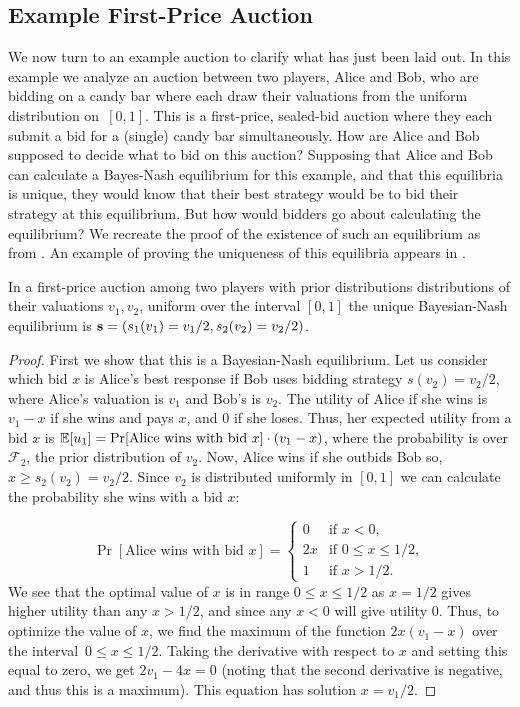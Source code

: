 \documentclass[12pt,twoside]{reedthesis}
\begin{document}
\subsection{Example First-Price Auction}
We now turn to an example auction to clarify what has just been laid out. In this example we analyze an auction between two players, Alice and Bob, who are bidding on a candy bar where each draw their valuations from the uniform distribution on~$[0,1]$. This is a first-price, sealed-bid auction where they each submit a bid for a (single) candy bar simultaneously. How are Alice and Bob supposed to decide what to bid on this auction? Supposing that Alice and Bob can calculate a Bayes-Nash equilibrium for this example, and that this equilibria is unique, they would know that their best strategy would be to bid their strategy at this equilibrium. But how would bidders go about calculating the equilibrium? We recreate the proof of the existence of such an equilibrium as from \cite{Nisan2007}. An example of proving the uniqueness of this equilibria appears in \cite{Levin2002}.

\begin{prop}
	In a first-price auction among two players with prior distributions distributions of their valuations $v_1,v_2$, uniform over the interval $[0,1]$ the unique Bayesian-Nash equilibrium is $\textbf{s} = (s_1(v_1) = v_1 / 2, s_2(v_2) = v_2 / 2)$.
\end{prop}

\begin{proof}{\citep{Nisan2007}}
	First we show that this is a Bayesian-Nash equilibrium. Let us consider which bid $x$ is Alice's best response if Bob uses bidding strategy $s(v_2) = v_2/2$, where Alice's valuation is $v_1$ and Bob's is $v_2$. The utility of Alice if she wins is $v_1 - x$ if she wins and pays $x$, and $0$ if she loses. Thus, her expected utility from a bid $x$ is $\mathbb{E}[u_1] = \Pr[\text{Alice wins with bid } x] \cdot (v_1 -x)$, where the probability is over $\mathcal{F}_2$, the prior distribution of $v_2$. Now, Alice wins if she outbids Bob so, $x \geq s_2(v_2) = v_2 / 2$. Since $v_2$ is distributed uniformly in $[0,1]$ we can calculate the probability she wins with a bid $x$: 
	
	\[
	\Pr[\text{Alice wins with bid } x] =
	\begin{cases}
	0 & \text{if } x < 0, \\
	2x & \text{if } 0 \leq x \leq 1/2,\\
	1 & \text{if } x > 1/2.
	\end{cases}
	\]
We see that the optimal value of $x$ is in range $0 \leq x \leq 1/2$ as $x = 1/2$ gives higher utility than any $x > 1/2$, and since any $x < 0$ will give utility $0$. Thus, to optimize the value of $x$, we find the maximum of the function $2x(v_1 - x)$ over the interval~$0 \leq x \leq 1/2$. Taking the derivative with respect to $x$ and setting this equal to zero, we get $2v_1 - 4x = 0$ (noting that the second derivative is negative, and thus this is a maximum). This equation has solution $x = v_1/2$.
\end{proof}
\end{document}

